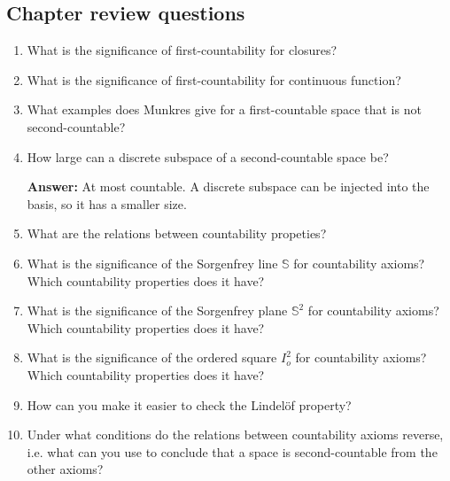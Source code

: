 \subsection{Chapter review questions}

\begin{enumerate}
    \item What is the significance of first-countability for closures?
    \item What is the significance of first-countability for continuous function?
    \item What examples does Munkres give for a first-countable space that is not second-countable?
    \item How large can a discrete subspace of a second-countable space be?
    
    \textbf{Answer:} At most countable. A discrete subspace can be injected into the basis, so it has a smaller size.
    \item What are the relations between countability propeties?
    \item What is the significance of the Sorgenfrey line \( \mathbb{S} \) for countability axioms? Which countability properties does it have?
    \item What is the significance of the Sorgenfrey plane \( \mathbb{S}^2 \) for countability axioms? Which countability properties does it have?
    \item What is the significance of the ordered square \( I_o^2 \) for countability axioms? Which countability properties does it have?
    \item How can you make it easier to check the Lindel\"of property?
    \item Under what conditions do the relations between countability axioms reverse, i.e. what can you use to conclude that a space is second-countable from the other axioms?
\end{enumerate}

